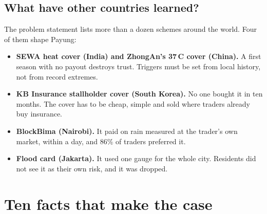 \documentclass[11pt,a4paper]{article}
\begin{document}
\subsection{What have other countries learned?}

The problem statement lists more than a dozen schemes around the world.\cite{ps} Four of them shape Payung:

\begin{itemize}[leftmargin=1.2em]
  \item \textbf{SEWA heat cover (India) and ZhongAn's 37\,\textdegree C cover (China).} A first season with no payout destroys trust. Triggers must be set from local history, not from record extremes.
  \item \textbf{KB Insurance stallholder cover (South Korea).} No one bought it in ten months. The cover has to be cheap, simple and sold where traders already buy insurance.
  \item \textbf{BlockBima (Nairobi).} It paid on rain measured at the trader's own market, within a day, and 86\% of traders preferred it.
  \item \textbf{Flood card (Jakarta).} It used one gauge for the whole city. Residents did not see it as their own risk, and it was dropped.
\end{itemize}

\section{Ten facts that make the case}\label{sec:facts}
\end{document}
